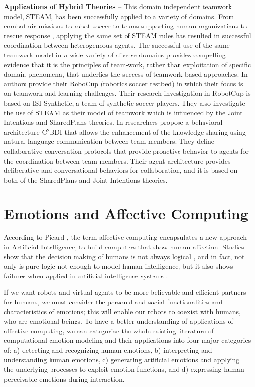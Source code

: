 \documentclass[12pt]{report}
\begin{document}
\textbf{Applications of Hybrid Theories} -- This domain independent teamwork
model, STEAM, has been successfully applied to a variety of domains.  From
combat air missions \cite{hill:synthetic-battlefield-aircraft} to robot soccer
\cite{kitano:robocup} to teams supporting human organizations
\cite{pynadath:teamwork-heterogeneous-agents} to rescue response
\cite{scerri:robot-agent-person}, applying the same set of STEAM rules has
resulted in successful coordination between heterogeneous agents. The successful
use of the same teamwork model in a wide variety of diverse domains provides
compelling evidence that it is the principles of team-work, rather than
exploitation of specific domain phenomena, that underlies the success of
teamwork based approaches. In \cite{marsella:robocup} authors provide their
RoboCup (robotics soccer testbed) in which their focus is on teamwork and
learning challenges. Their research investigation in RobotCup is based on ISI
Synthetic, a team of synthetic soccer-players. They also investigate the use of
STEAM as their model of teamwork which is influenced by the Joint Intentions and
SharedPlans theories. In \cite{kabil:coordination-mechanisms} researchers
propose a behavioral architecture C$^2$BDI that allows the enhancement of the
knowledge sharing using natural language communication between team members.
They define collaborative conversation protocols that provide proactive behavior
to agents for the coordination between team members. Their agent architecture
provides deliberative and conversational behaviors for collaboration, and it is
based on both of the SharedPlans and Joint Intentions theories.

\section{Emotions and Affective Computing}
According to Picard \cite{picard:affective-computing}, the term affective
computing encapsulates a new approach in Artificial Intelligence, to build
computers that show human affection. Studies show that the decision making of
humans is not always logical \cite{GrossbergGutowski:affect-cognition}, and in
fact, not only is pure logic not enough to model human intelligence, but it also
shows failures when applied in artificial intelligence systems
\cite{dreyfus:artificial-critique}.

If we want robots and virtual agents to be more believable and efficient
partners for humans, we must consider the personal and social functionalities
and characteristics of emotions; this will enable our robots to coexist with
humans, who are emotional beings. To have a better understanding of applications
of affective computing, we can categorize the whole existing literature of
computational emotion modeling and their applications into four major categories
of: a) detecting and recognizing human emotions, b) interpreting and
understanding human emotions, c) generating artificial emotions and applying the
underlying processes to exploit emotion functions, and d) expressing
human-perceivable emotions during interaction.
\end{document}
